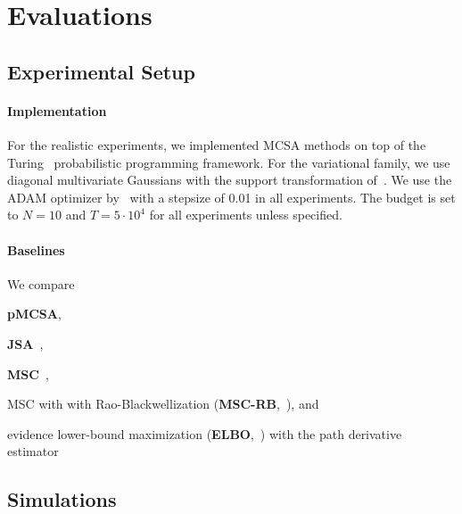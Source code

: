 \vspace{-0.05in}
\section{Evaluations}\label{section:eval}
\vspace{-0.05in}
\subsection{Experimental Setup}
\vspace{-0.05in}
\paragraph{Implementation}
For the realistic experiments, we implemented MCSA methods on top of the Turing~\citep{ge2018t} probabilistic programming framework.
For the variational family, we use diagonal multivariate Gaussians with the support transformation of~\citet{JMLR:v18:16-107}.
We use the ADAM optimizer by~\citet{kingma_adam_2015} with a stepsize of 0.01 in all experiments.
The budget is set to \(N=10\) and \(T=5\cdot10^4\) for all experiments unless specified.

\vspace{-0.1in}
\paragraph{Baselines}
We compare
\begin{enumerate*}[label=\textbf{(\roman*)}]
  \item \textbf{pMCSA},
  \item \textbf{JSA}~\citep{pmlr-v124-ou20a},
  \item \textbf{MSC}~\citep{NEURIPS2020_b2070693},
  \item MSC with with Rao-Blackwellization (\textbf{MSC-RB},~\citealt{NEURIPS2020_b2070693}), and
  \item evidence lower-bound maximization (\textbf{ELBO},~\citealt{pmlr-v33-ranganath14, JMLR:v18:16-107}) with the path derivative estimator~\citep{NIPS2017_e91068ff}
\end{enumerate*}

\vspace{-0.1in}
\subsection{Simulations}\label{section:simulation}
\vspace{-0.05in}
